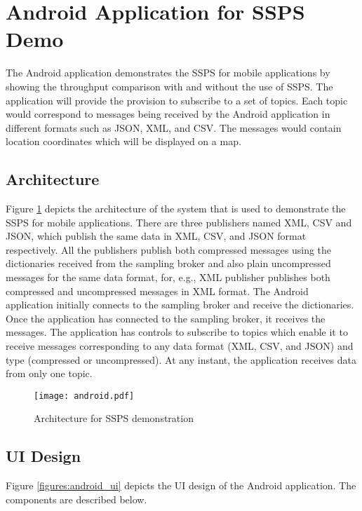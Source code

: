\section{Android Application for SSPS Demo}

The Android application demonstrates the SSPS for mobile applications by showing the throughput comparison with and without the use of SSPS. The application will provide the provision to subscribe to a set of topics. Each topic would correspond to messages being received by the Android application in different formats such as JSON, XML, and CSV. The messages would contain location coordinates which will be displayed on a map. 

\subsection{Architecture}

Figure \ref{figures:android} depicts the architecture of the system that is used to demonstrate the SSPS for mobile applications. There are three publishers named XML, CSV and JSON, which publish the same data in XML, CSV, and JSON format respectively. All the publishers publish both compressed messages using the dictionaries received from the sampling broker and also plain uncompressed messages for the same data format, for, e.g., XML publisher publishes both compressed and uncompressed messages in XML format. The Android application initially connects to the sampling broker and receive the dictionaries. Once the application has connected to the sampling broker, it receives the messages. The application has controls to subscribe to topics which enable it to receive messages corresponding to any data format (XML, CSV, and JSON) and type (compressed or uncompressed).
At any instant, the application receives data from only one topic.

\makeatletter
\setlength{\intextsep}{20pt}
\makeatother

\begin{figure}[h!]
\centering
\texttt{[image: android.pdf]}
\caption{Architecture for SSPS demonstration}\label{figures:android}
\end{figure}

\subsection{UI Design}

Figure \ref{figures:android_ui} depicts the UI design of the Android application. The components are described below.


